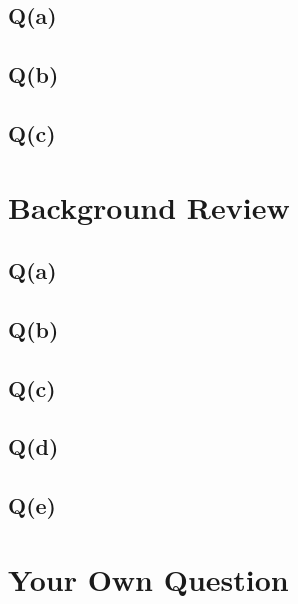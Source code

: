 \documentclass[11pt]{article}
\begin{document}
\subsection{Q(a)}

\subsection{Q(b)}

\subsection{Q(c)}

\pagebreak
\section{Background Review}

\subsection{Q(a)}

\subsection{Q(b)}

\subsection{Q(c)}

\subsection{Q(d)}

\subsection{Q(e)}

\pagebreak
\section{Your Own Question}
\end{document}
